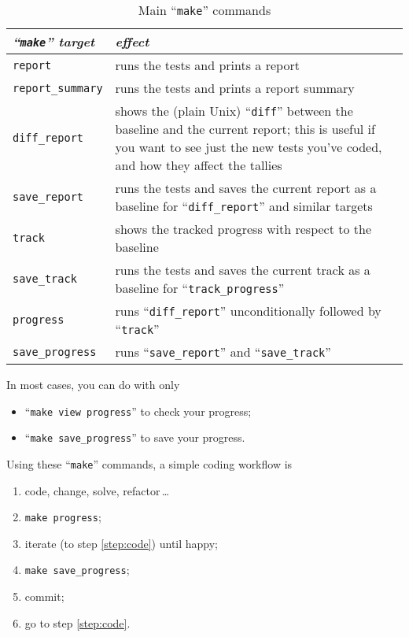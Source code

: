 \documentclass[twoside, a4paper, article]{memoir}
\newcommand*\ellipsis{\,\ldots}
\begin{document}
\begin{table}
  \centering
  \renewcommand\arraystretch{1.75}
  \begin{tabularx}{\linewidth}{lX}
    \toprule
    \emph{``\texttt{make}'' target} & \emph{effect} \\
    \midrule
    \texttt{report} & runs the tests and prints a report \\
    \texttt{report\_summary} & runs the tests and prints a report summary \\
    \texttt{diff\_report}
      & shows the (plain Unix) ``\texttt{diff}'' between the baseline and the
        current report; this is useful if you want to see just the new tests
        you've coded, and how they affect the tallies \\
    \texttt{save\_report}
      & runs the tests and saves the current report as a baseline for
        ``\texttt{diff\_report}'' and similar targets \\
    \texttt{track} & shows the tracked progress with respect to the baseline \\
    \texttt{save\_track}
      & runs the tests and saves the current track as a baseline for
        ``\texttt{track\_progress}'' \\
    \texttt{progress}
      & runs ``\texttt{diff\_report}'' unconditionally followed by
        ``\texttt{track}'' \\
    \texttt{save\_progress}
      & runs ``\texttt{save\_report}'' and ``\texttt{save\_track}'' \\
    \bottomrule
  \end{tabularx}
  \caption{Main ``\texttt{make}'' commands}
  \label{tab:main-make-commands}
\end{table}

In most cases, you can do with only
\begin{itemize}
\item ``\texttt{make view progress}'' to check your progress;
\item ``\texttt{make save\_progress}'' to save your progress.
\end{itemize}

Using these ``\texttt{make}'' commands, a simple coding workflow is
\begin{enumerate}
\item\label{step:code} code, change, solve, refactor\ellipsis{}
\item \texttt{make progress};
\item iterate (to step \ref{step:code}) until happy;
\item \texttt{make save\_progress};
\item commit;
\item go to step \ref{step:code}.
\end{enumerate}
\end{document}
